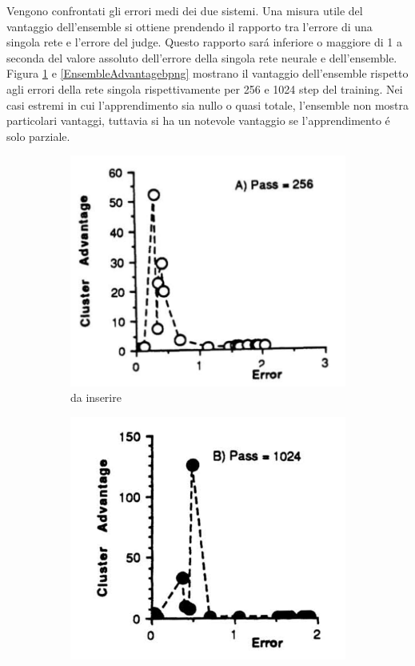 \documentclass[a4paper,10pt]{article}
\begin{document}
 
 Vengono confrontati gli errori medi dei due sistemi. Una misura utile del vantaggio dell'ensemble si ottiene prendendo il rapporto tra l'errore di una singola rete e l'errore del judge. Questo rapporto sar\'a inferiore o maggiore di 1 a seconda del valore assoluto dell'errore della singola rete neurale e dell'ensemble. Figura \ref{EnsembleAdvantageapng} e \ref{EnsembleAdvantagebpng} mostrano il vantaggio dell'ensemble rispetto agli errori della rete singola rispettivamente per 256 e 1024 step del training. Nei casi estremi in cui l'apprendimento sia nullo o quasi totale, l'ensemble non mostra particolari vantaggi, tuttavia si ha un notevole vantaggio se l'apprendimento \'e solo parziale.
 
 \begin{figure}[h!]
  \centering
  \begin{subfigure}[b]{0.4\linewidth}
   \includegraphics[width=\linewidth]{ClusterErrora.png}
   \caption{da inserire}
   \label{EnsembleAdvantageapng}
  \end{subfigure}
  \begin{subfigure}[b]{0.4\linewidth}
   \includegraphics[width=\linewidth]{ClusterErrorb.png}

\end{subfigure}
\end{figure}
\end{document}
